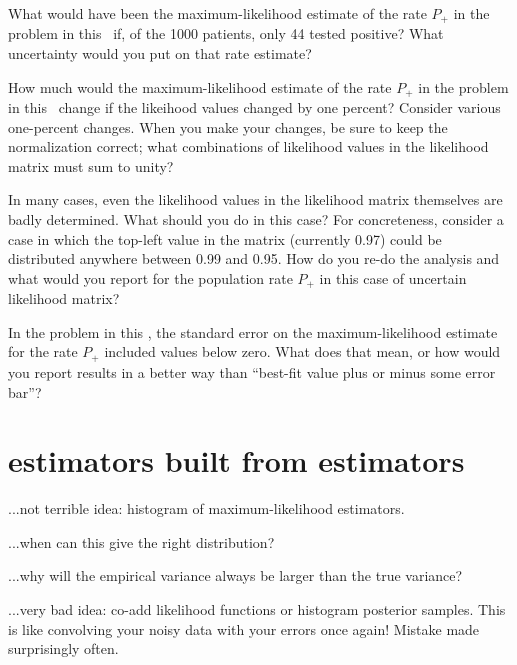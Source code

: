 \documentclass[12pt,twoside]{article}
\begin{document}
\begin{problem}
What would have been the maximum-likelihood estimate of the rate $P_+$
in the problem in this \sectionname\ if, of the 1000 patients, only 44
tested positive?  What uncertainty would you put on that rate
estimate?
\end{problem}

\begin{problem}
How much would the maximum-likelihood estimate of the rate $P_+$ in the
problem in this \sectionname\ change if the likeihood values changed
by one percent?  Consider various one-percent changes.  When you make
your changes, be sure to keep the normalization correct; what
combinations of likelihood values in the likelihood matrix must sum to
unity?
\end{problem}

\begin{problem}
In many cases, even the likelihood values in the likelihood matrix
themselves are badly determined.  What should you do in this case?
For concreteness, consider a case in which the top-left value in the
matrix (currently 0.97) could be distributed anywhere between 0.99 and
0.95.  How do you re-do the analysis and what would you report for the
population rate $P_+$ in this case of uncertain likelihood matrix?
\end{problem}

\begin{problem}
In the problem in this \sectionname, the standard error on the
maximum-likelihood estimate for the rate $P_+$ included
values below zero.  What does that mean, or how would you report
results in a better way than ``best-fit value plus or minus some error
bar''?
\end{problem}

\section{estimators built from estimators}

...not terrible idea: histogram of maximum-likelihood estimators.

...when can this give the right distribution?

...why will the empirical variance always be larger than the true variance?

...very bad idea: co-add likelihood functions or histogram posterior
samples.  This is like convolving your noisy data with your errors
once again!  Mistake made surprisingly often.
\end{document}
